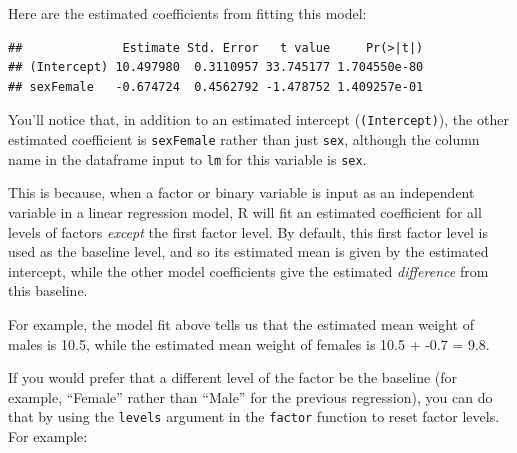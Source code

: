 \documentclass[]{book}
\makeatletter
\newenvironment{Shaded}{\begin{snugshade}}{\end{snugshade}}
\newcommand{\KeywordTok}[1]{\textcolor[rgb]{0.13,0.29,0.53}{\textbf{{#1}}}}
\newcommand{\DataTypeTok}[1]{\textcolor[rgb]{0.13,0.29,0.53}{{#1}}}
\newcommand{\StringTok}[1]{\textcolor[rgb]{0.31,0.60,0.02}{{#1}}}
\newcommand{\NormalTok}[1]{{#1}}
\newenvironment{kframe}{%
\medskip{}
\setlength{\fboxsep}{.8em}
 \def\at@end@of@kframe{}%
 \ifinner\ifhmode%
  \def\at@end@of@kframe{\end{minipage}}%
  \begin{minipage}{\columnwidth}%
 \fi\fi%
 \def\FrameCommand##1{\hskip\@totalleftmargin \hskip-\fboxsep
 \colorbox{shadecolor}{##1}\hskip-\fboxsep
     \hskip-\linewidth \hskip-\@totalleftmargin \hskip\columnwidth}%
 \MakeFramed {\advance\hsize-\width
   \@totalleftmargin\z@ \linewidth\hsize
   \@setminipage}}%
 {\par\unskip\endMakeFramed%
 \at@end@of@kframe}
\renewenvironment{Shaded}{\begin{kframe}}{\end{kframe}}
\makeatother
\begin{document}
Here are the estimated coefficients from fitting this model:

\begin{Shaded}
\end{Shaded}

\begin{verbatim}
##              Estimate Std. Error   t value     Pr(>|t|)
## (Intercept) 10.497980  0.3110957 33.745177 1.704550e-80
## sexFemale   -0.674724  0.4562792 -1.478752 1.409257e-01
\end{verbatim}

You'll notice that, in addition to an estimated intercept
(\texttt{(Intercept)}), the other estimated coefficient is
\texttt{sexFemale} rather than just \texttt{sex}, although the column
name in the dataframe input to \texttt{lm} for this variable is
\texttt{sex}.

This is because, when a factor or binary variable is input as an
independent variable in a linear regression model, R will fit an
estimated coefficient for all levels of factors \emph{except} the first
factor level. By default, this first factor level is used as the
baseline level, and so its estimated mean is given by the estimated
intercept, while the other model coefficients give the estimated
\emph{difference} from this baseline.

For example, the model fit above tells us that the estimated mean weight
of males is 10.5, while the estimated mean weight of females is 10.5 +
-0.7 = 9.8.

If you would prefer that a different level of the factor be the baseline
(for example, ``Female'' rather than ``Male'' for the previous
regression), you can do that by using the \texttt{levels} argument in
the \texttt{factor} function to reset factor levels. For example:

\begin{Shaded}
\end{Shaded}
\end{document}

